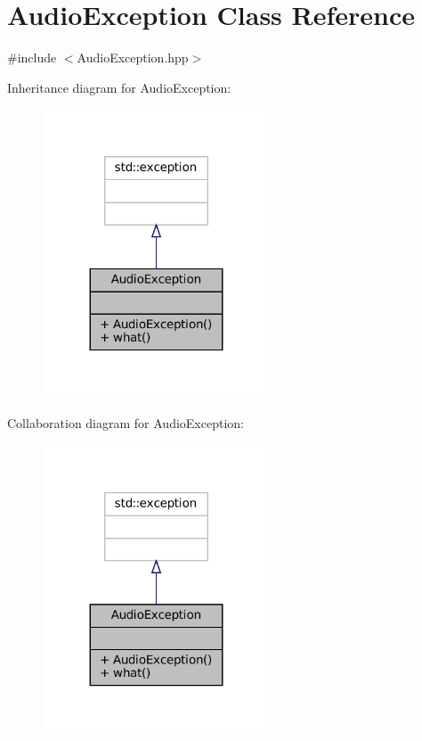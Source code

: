 \hypertarget{classAudioException}{}\section{Audio\+Exception Class Reference}
\label{classAudioException}


{\ttfamily \#include $<$Audio\+Exception.\+hpp$>$}



Inheritance diagram for Audio\+Exception\+:
\nopagebreak
\begin{figure}[H]
\begin{center}
\leavevmode
\includegraphics[width=191pt]{classAudioException__inherit__graph}
\end{center}
\end{figure}


Collaboration diagram for Audio\+Exception\+:
\nopagebreak
\begin{figure}[H]
\begin{center}
\leavevmode
\includegraphics[width=191pt]{classAudioException__coll__graph}
\end{center}
\end{figure}
